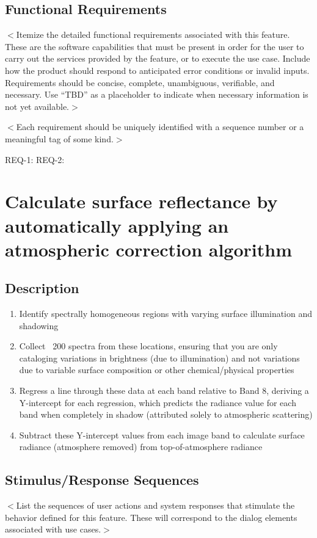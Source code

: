 \documentclass{scrreprt}
\begin{document}
\subsection{Functional Requirements}
$<$Itemize the detailed functional requirements associated with this feature.  
These are the software capabilities that must be present in order for the user 
to carry out the services provided by the feature, or to execute the use case.  
Include how the product should respond to anticipated error conditions or 
invalid inputs. Requirements should be concise, complete, unambiguous, 
verifiable, and necessary. Use “TBD” as a placeholder to indicate when necessary 
information is not yet available.$>$

$<$Each requirement should be uniquely identified with a sequence number or a 
meaningful tag of some kind.$>$

REQ-1:  REQ-2:

\section{Calculate surface reflectance by automatically applying an atmospheric correction algorithm}
\subsection{Description}
\begin{enumerate}
	\item Identify spectrally homogeneous regions with varying surface illumination 
		and shadowing
	\item Collect ~200 spectra from these locations, ensuring that you are only 
		cataloging variations in brightness (due to illumination) and not variations 
		due to variable surface composition or other chemical/physical properties
	\item Regress a line through these data at each band relative to Band 8, deriving a 
		Y-intercept for each regression, which predicts the radiance value for each 
		band when completely in shadow (attributed solely to atmospheric scattering)
	\item Subtract these Y-intercept values from each image band to calculate surface 
		radiance (atmosphere removed) from top-of-atmosphere radiance
\end{enumerate}


\subsection{Stimulus/Response Sequences}
$<$List the sequences of user actions and system responses that stimulate the 
behavior defined for this feature. These will correspond to the dialog elements 
associated with use cases.$>$
\end{document}
